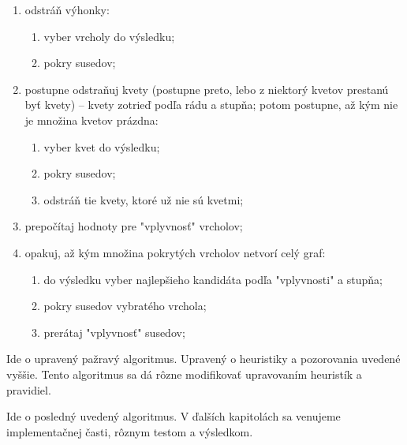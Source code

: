 \begin{enumerate}
	\item odstráň výhonky:
	\begin{enumerate}
		\item vyber vrcholy do výsledku;
		\item pokry susedov;
	\end{enumerate}
	\item postupne odstraňuj kvety (postupne preto, lebo z niektorý kvetov 
		prestanú byť kvety) -- kvety zotrieď podľa rádu a stupňa; potom 
		postupne, až kým nie je množina kvetov prázdna:
		\begin{enumerate}
			\item vyber kvet do výsledku;
			\item pokry susedov;
			\item odstráň tie kvety, ktoré už nie sú kvetmi;
		\end{enumerate}
	\item prepočítaj hodnoty pre "vplyvnosť" vrcholov;
	\item opakuj, až kým množina pokrytých vrcholov netvorí celý graf:
		\begin{enumerate}
			\item do výsledku vyber najlepšieho kandidáta podľa "vplyvnosti" 
				a stupňa;
			\item pokry susedov vybratého vrchola;
			\item prerátaj "vplyvnosť" susedov;
		\end{enumerate}
\end{enumerate}

Ide o upravený pažravý algoritmus. Upravený o heuristiky a pozorovania uvedené 
vyššie. Tento algoritmus sa dá rôzne modifikovať upravovaním heuristík a 
pravidiel. 

Ide o posledný uvedený algoritmus. V ďalších kapitolách sa venujeme 
implementačnej časti, rôznym testom a výsledkom.